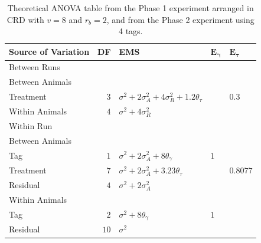 \documentclass[12pt,a4paper]{article}
\begin{document}
\begin{table}[ht]
\centering
 \caption{Theoretical ANOVA table from the Phase 1 experiment arranged in CRD with $v = 8$ and $r_b = 2$, and from the Phase 2 experiment using 4 tags.}
 \begin{tabular}[t]{lrlll} 
 \toprule 
 \multicolumn{1}{l}{\textbf{Source of Variation}} & \multicolumn{1}{l}{\textbf{DF}} & \multicolumn{1}{l}{\textbf{EMS}}& \multicolumn{1}{l}{$\bm{E_{\gamma}}$}&\multicolumn{1}{l}{$\bm{E_{\tau}}$}\\ 
 \midrule 
 Between Runs &  &  & & \\ 
 \quad Between Animals &  &  & & \\ 
 \quad \quad Treatment & $3$ & $\sigma^2+2\sigma_{A}^2+4\sigma_{R}^2+1.2\theta_{\tau}$ & & $0.3$\\ 
 \quad Within Animals & $4$ & $\sigma^2+4\sigma_{R}^2$ & & \\ \hline 
 Within Run &  &  & & \\ 
 \quad Between Animals &  &  & & \\ 
 \quad \quad Tag & $1$ & $\sigma^2+2\sigma_{A}^2+8\theta_{\gamma}$ &$1$ & \\ 
 \quad \quad Treatment & $7$ & $\sigma^2+2\sigma_{A}^2+ 3.23\theta_{\tau}$ & & $0.8077$\\ 
 \quad \quad Residual & $4$ & $\sigma^2+2\sigma_{A}^2$ & & \\ \hline 
 \quad Within Animals &  &  & & \\ 
 \quad \quad Tag & $2$ & $\sigma^2+8\theta_{\gamma}$ &$1$ & \\ 
 \quad \quad Residual & $10$ & $\sigma^2$ & & \\ 
 \bottomrule 
 \end{tabular} 
 \label{tab:ANOVAPhaseCRD31} 
\end{table} 
\end{document}

